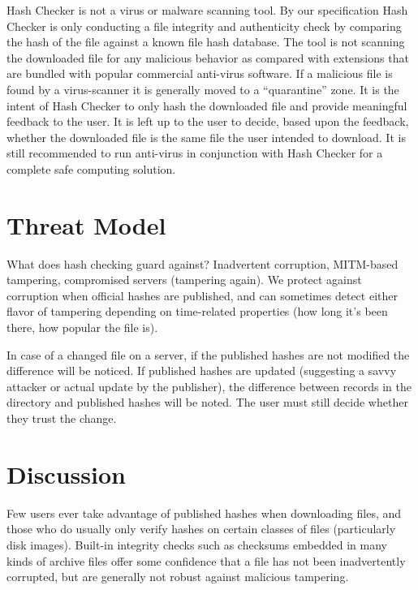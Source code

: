 \documentclass[letterpaper,twocolumn,10pt]{article}
\begin{document}
Hash Checker is not a virus or malware scanning tool. By our specification Hash Checker is only conducting a file integrity and authenticity check by comparing the hash of the file against a known file hash database. The tool is not scanning the downloaded file for any malicious behavior as compared with extensions that are bundled with popular commercial anti-virus software. If a malicious file is found by a virus-scanner it is generally moved to a “quarantine” zone. It is the intent of Hash Checker to only hash the downloaded file and provide meaningful feedback to the user. It is left up to the user to decide, based upon the feedback, whether the downloaded file is the same file the user intended to download. It is still recommended to run anti-virus in conjunction with Hash Checker for a complete safe computing solution.

\section{Threat Model}

What does hash checking guard against? Inadvertent corruption, MITM-based tampering, compromised servers (tampering again). We protect against corruption when official hashes are published, and can sometimes detect either flavor of tampering depending on time-related properties (how long it’s been there, how popular the file is).

In case of a changed file on a server, if the published hashes are not modified the difference will be noticed. If published hashes are updated (suggesting a savvy attacker or actual update by the publisher), the difference between records in the directory and published hashes will be noted. The user must still decide whether they trust the change.

\section{Discussion}

Few users ever take advantage of published hashes when downloading files, and those who do usually only verify hashes on certain classes of files (particularly disk images). Built-in integrity checks such as checksums embedded in many kinds of archive files offer some confidence that a file has not been inadvertently corrupted, but are generally not robust against malicious tampering.
\end{document}
